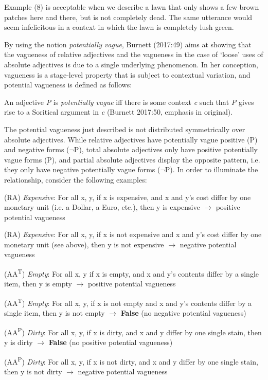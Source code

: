 \documentclass[output=paper
,modfonts
,nonflat]{langsci/langscibook}
\begin{document}
Example (8) is acceptable when we describe a lawn that only shows a few brown patches here and there, but is not completely dead. The same utterance would seem infelicitous in a context in which the lawn is completely lush green.

By using the notion \textit{potentially vague}, Burnett (2017:49) aims at showing that the vagueness of relative adjectives and the vagueness in the case of `loose' uses of absolute adjectives is due to a single underlying phenomenon. In her conception, vagueness is a stage-level property that is subject to contextual variation, and potential vagueness is defined as follows:

\begin{examples}
	\item An adjective \textit{P} is \textit{potentially vague} iff there is some context \textit{c} such that \textit{P} gives rise to a Soritical argument in \textit{c} (Burnett 2017:50, emphasis in original). %
\end{examples}

The potential vagueness just described is not distributed symmetrically over absolute adjectives. While relative adjectives have potentially vague positive (P) and negative forms ($\neg$P), total absolute adjectives only have positive potentially vague forms (P), and partial absolute adjectives display the opposite pattern, i.e. they only have negative potentially vague forms ($\neg$P). In order to illuminate the relationship, consider the following examples: %

\begin{examples}
	\item (RA) \textit{Expensive}: For all x, y, if x is expensive, and x and y's cost differ by one monetary unit (i.e. a Dollar, a Euro, etc.), then y is expensive {$\rightarrow$ \0} positive potential vagueness
	\item (RA) \textit{Expensive}: For all x, y, if x is not expensive and x and y's cost differ by one monetary unit (see above), then y is not expensive {$\rightarrow$ \0} negative potential vagueness
	\item (AA\textsuperscript{T}) \textit{Empty}: For all x, y if x is empty, and x and y's contents differ by a single item, then y is empty {$\rightarrow$ \0} positive potential vagueness
	\item (AA\textsuperscript{T}) \textit{Empty}: For all x, y, if x is not empty and x and y's contents differ by a single item, then y is not empty {$\rightarrow$ \0} \textbf{False} (no negative potential vagueness)
	\item (AA\textsuperscript{P}) \textit{Dirty}: For all x, y, if x is dirty, and x and y differ by one single stain, then y is dirty {$\rightarrow$ \0} \textbf{False} (no positive potential vagueness)
	\item (AA\textsuperscript{P}) \textit{Dirty}: For all x, y, if x is not dirty, and x and y differ by one single stain, then y is not dirty {$\rightarrow$ \0} negative potential vagueness
\end{examples} %
\end{document}
